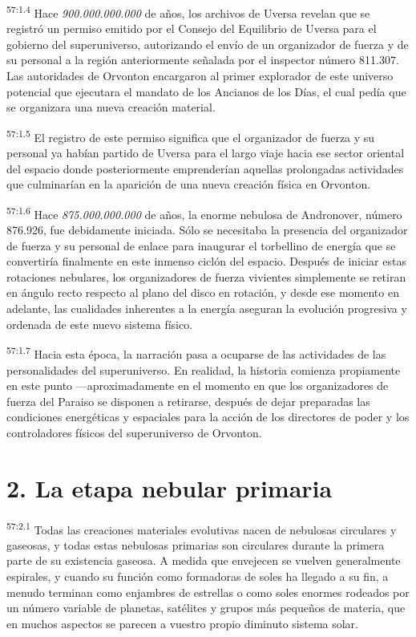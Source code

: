 \par
\textsuperscript{57:1.4} Hace \textit{900.000.000.000} de años, los archivos de Uversa revelan que se registró un permiso emitido por el Consejo del Equilibrio de Uversa para el gobierno del superuniverso, autorizando el envío de un organizador de fuerza y de su personal a la región anteriormente señalada por el inspector número 811.307. Las autoridades de Orvonton encargaron al primer explorador de este universo potencial que ejecutara el mandato de los Ancianos de los Días, el cual pedía que se organizara una nueva creación material.

\par
\textsuperscript{57:1.5} El registro de este permiso significa que el organizador de fuerza y su personal ya habían partido de Uversa para el largo viaje hacia ese sector oriental del espacio donde posteriormente emprenderían aquellas prolongadas actividades que culminarían en la aparición de una nueva creación física en Orvonton.

\par
\textsuperscript{57:1.6} Hace \textit{875.000.000.000} de años, la enorme nebulosa de Andronover, número 876.926, fue debidamente iniciada. Sólo se necesitaba la presencia del organizador de fuerza y su personal de enlace para inaugurar el torbellino de energía que se convertiría finalmente en este inmenso ciclón del espacio. Después de iniciar estas rotaciones nebulares, los organizadores de fuerza vivientes simplemente se retiran en ángulo recto respecto al plano del disco en rotación, y desde ese momento en adelante, las cualidades inherentes a la energía aseguran la evolución progresiva y ordenada de este nuevo sistema físico.

\par
\textsuperscript{57:1.7} Hacia esta época, la narración pasa a ocuparse de las actividades de las personalidades del superuniverso. En realidad, la historia comienza propiamente en este punto ---aproximadamente en el momento en que los organizadores de fuerza del Paraiso se disponen a retirarse, después de dejar preparadas las condiciones energéticas y espaciales para la acción de los directores de poder y los controladores físicos del superuniverso de Orvonton.

\section*{2. La etapa nebular primaria}
\par
\textsuperscript{57:2.1} Todas las creaciones materiales evolutivas nacen de nebulosas circulares y gaseosas, y todas estas nebulosas primarias son circulares durante la primera parte de su existencia gaseosa. A medida que envejecen se vuelven generalmente espirales, y cuando su función como formadoras de soles ha llegado a su fin, a menudo terminan como enjambres de estrellas o como soles enormes rodeados por un número variable de planetas, satélites y grupos más pequeños de materia, que en muchos aspectos se parecen a vuestro propio diminuto sistema solar.

